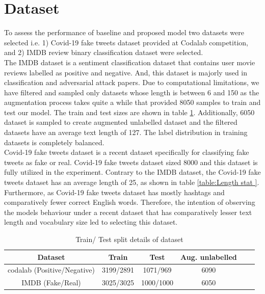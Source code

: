 \documentclass[%
	BCOR=8mm, %
	DIV=12,
	toc=bibliography, %
	toc=listof, %
	oneside, %
	egregdoesnotlikesansseriftitles, %
	]{scrbook}
\begin{document}
\section{Dataset}
\label{label:dataset}
To assess the performance of baseline and proposed model two datasets were selected i.e. 1) Covid-19  fake tweets dataset \cite{patwa_fighting_2021} provided at Codalab competition, and 2) IMDB review binary classification dataset were selected. \\
The IMDB dataset is a sentiment classification dataset \cite{maas_learning_2011-1} that contains user movie reviews labelled as positive and negative. And, this dataset is majorly used in classification and adversarial attack papers. Due to computational limitations, we have filtered and sampled only datasets whose length is between 6 and 150 as the augmentation process takes quite a while that provided 8050 samples to train and test our model. The train and test sizes are shown in table \ref{table:train/testtable}. Additionally, 6050 dataset is sampled to create augmented unlabelled dataset and the filtered datasets have an average text length of 127. The label distribution in training datasets is completely balanced.\\
Covid-19 fake tweets dataset is a recent dataset specifically for classifying fake tweets as fake or real. Covid-19 fake tweets dataset sized 8000 and this dataset is fully utilized in the experiment. Contrary to the IMDB dataset, the Covid-19  fake tweets dataset has an average length of 25, as shown in table \ref{table:Length stat }. Furthermore, as Covid-19  fake tweets dataset has mostly hashtags and comparatively fewer correct English words. Therefore, the intention of observing the models behaviour under a recent dataset that has comparatively lesser text length and vocabulary size led to selecting this dataset.

\begin{table}[!h]
\centering
\begin{tabular}{ |c|c|c|c|c|c| }
\hline
Dataset & Train & Test  & Aug. unlabelled \\
\hline
codalab (Positive/Negative) & 3199/2891 & 1071/969 & 6090 \\
\hline
IMDB (Fake/Real) & 3025/3025 & 1000/1000 & 6050  \\
\hline
\end{tabular}
\caption[Train/Test/Unlabelled details of dataset]{Train/ Test split details of dataset }
\label{table:train/testtable}
\end{table}
\end{document}
